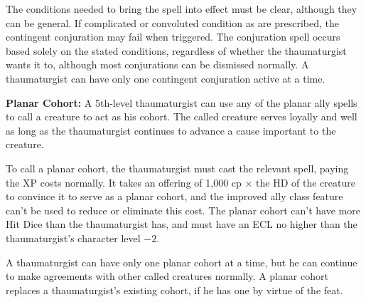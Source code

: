 {The conditions needed to bring the spell into effect must be clear, although they can be general. If complicated or convoluted condition as are prescribed, the contingent conjuration may fail when triggered. The conjuration spell occurs based solely on the stated conditions, regardless of whether the thaumaturgist wants it to, although most conjurations can be dismissed normally. A thaumaturgist can have only one contingent conjuration active at a time.

\textbf{Planar Cohort:} A 5th-level thaumaturgist can use any of the planar ally spells to call a creature to act as his cohort. The called creature serves loyally and well as long as the thaumaturgist continues to advance a cause important to the creature.

To call a planar cohort, the thaumaturgist must cast the relevant spell, paying the XP costs normally. It takes an offering of 1,000 cp $\times$ the HD of the creature to convince it to serve as a planar cohort, and the improved ally class feature can't be used to reduce or eliminate this cost. The planar cohort can't have more Hit Dice than the thaumaturgist has, and must have an ECL no higher than the thaumaturgist's character level $-2$.

A thaumaturgist can have only one planar cohort at a time, but he can continue to make agreements with other called creatures normally. A planar cohort replaces a thaumaturgist's existing cohort, if he has one by virtue of the  feat.
}